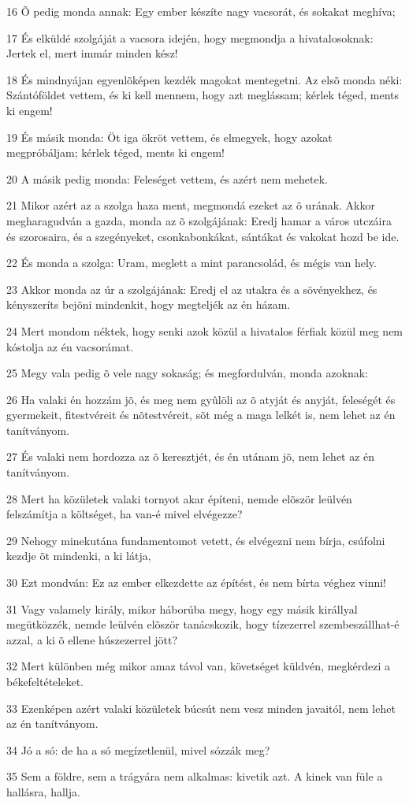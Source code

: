 \par 16 Õ pedig monda annak: Egy ember készíte nagy vacsorát, és sokakat meghíva;
\par 17 És elküldé szolgáját a vacsora idején, hogy megmondja a hivatalosoknak: Jertek el, mert immár minden kész!
\par 18 És mindnyájan egyenlõképen kezdék magokat mentegetni. Az elsõ monda néki: Szántóföldet vettem, és ki kell mennem, hogy azt meglássam; kérlek téged, ments ki engem!
\par 19 És másik monda: Öt iga ökröt vettem, és elmegyek, hogy azokat megpróbáljam; kérlek téged, ments ki engem!
\par 20 A másik pedig monda: Feleséget vettem, és azért nem mehetek.
\par 21 Mikor azért az a szolga haza ment, megmondá ezeket az õ urának. Akkor megharagudván a gazda, monda az õ szolgájának: Eredj hamar a város utczáira és szorosaira, és a szegényeket, csonkabonkákat, sántákat és vakokat hozd be ide.
\par 22 És monda a szolga: Uram, meglett a mint parancsolád, és mégis van hely.
\par 23 Akkor monda az úr a szolgájának: Eredj el az utakra és a sövényekhez, és kényszeríts bejõni mindenkit, hogy megteljék az én házam.
\par 24 Mert mondom néktek, hogy senki azok közül a hivatalos férfiak  közül meg nem kóstolja az én vacsorámat.
\par 25 Megy vala pedig õ vele nagy sokaság; és megfordulván, monda azoknak:
\par 26 Ha valaki én hozzám jõ, és meg nem gyûlöli az õ atyját és anyját, feleségét és gyermekeit, fitestvéreit és nõtestvéreit, sõt még a maga lelkét is, nem lehet az én tanítványom.
\par 27 És valaki nem hordozza az õ keresztjét, és én utánam jõ, nem lehet az én tanítványom.
\par 28 Mert ha közületek valaki tornyot akar építeni, nemde elõször leülvén felszámítja a költséget, ha van-é mivel elvégezze?
\par 29 Nehogy minekutána fundamentomot vetett, és elvégezni nem bírja, csúfolni kezdje õt mindenki, a ki látja,
\par 30 Ezt mondván: Ez az ember elkezdette az építést, és nem bírta véghez vinni!
\par 31 Vagy valamely király, mikor háborúba megy, hogy egy másik királlyal megütközzék, nemde leülvén elõször tanácskozik, hogy tízezerrel szembeszállhat-é azzal, a ki õ ellene húszezerrel jött?
\par 32 Mert különben még mikor amaz távol van, követséget küldvén, megkérdezi a békefeltételeket.
\par 33 Ezenképen azért valaki közületek búcsút nem vesz minden javaitól, nem lehet az én tanítványom.
\par 34 Jó a só: de ha a só megízetlenül, mivel sózzák meg?
\par 35 Sem a földre, sem a trágyára nem alkalmas: kivetik azt. A kinek van füle a hallásra, hallja.

